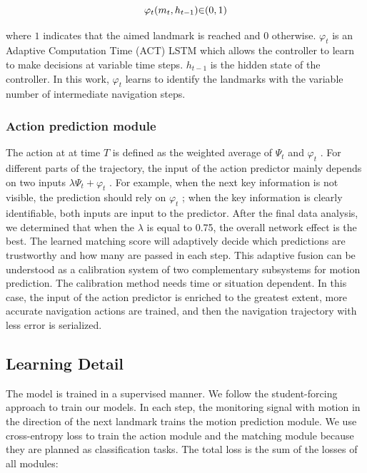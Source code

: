 \begin{equation}
	\centering
	{\varphi}_{t}({m}_{t},{h}_{t-1}){\in}{({0},{1})}
\end{equation}

where ${1}$ indicates that the aimed landmark is reached and ${0}$ otherwise. ${{\varphi}_{t}}$ is an Adaptive Computation Time (ACT) LSTM which allows the controller to learn to make decisions at variable time steps. ${h}_{t-1}$ is the hidden state of the controller. In this work, ${{\varphi}_{t}}$ learns to identify the landmarks with the variable number of intermediate navigation steps.

\subsubsection{Action prediction module}
	
The action at at time ${T}$ is defined as the weighted average of ${{\Psi}_{t}}$ and ${{\varphi}_{t}}$ . For different parts of the trajectory, the input of the action predictor mainly depends on  two inputs ${{\lambda}{\Psi}_{t} + {\varphi}_{t}}$ . For example, when the next key information is not visible, the prediction should rely on ${{\varphi}_{t}}$ ; when the key information is clearly identifiable, both inputs are input to the predictor. After the final data analysis, we determined that when the ${\lambda}$  is equal to 0.75, the overall network effect is the best. The learned matching score will adaptively decide which predictions are trustworthy and how many are passed in each step. This adaptive fusion can be understood as a calibration system of two complementary subsystems for motion prediction. The calibration method needs time or situation dependent. In this case, the input of the action predictor is enriched to the greatest extent, more accurate navigation actions are trained, and then the navigation trajectory with less error is serialized.
	
\subsection{Learning Detail}
	
The model is trained in a supervised manner. We follow the student-forcing approach to train our models. In each step, the monitoring signal with motion in the direction of the next landmark trains the motion prediction module. We use cross-entropy loss to train the action module and the matching module because they are planned as classification tasks. The total loss is the sum of the losses of all modules:
	
